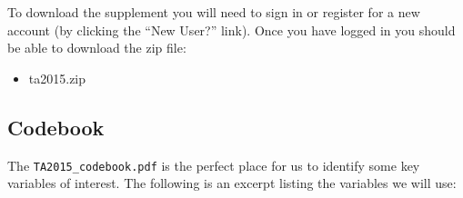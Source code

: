 \documentclass[]{book}
\providecommand{\tightlist}{%
  \setlength{\itemsep}{0pt}\setlength{\parskip}{0pt}}
\theoremstyle{definition}
\theoremstyle{definition}
\theoremstyle{remark}
\begin{document}
To download the supplement you will need to sign in or register for a
new account (by clicking the ``New User?'' link). Once you have logged
in you should be able to download the zip file:

\begin{itemize}
\tightlist
\item
  ta2015.zip
\end{itemize}

\subsection{Codebook}\label{codebook}

The \texttt{TA2015\_codebook.pdf} is the perfect place for us to
identify some key variables of interest. The following is an excerpt
listing the variables we will use:
\end{document}
